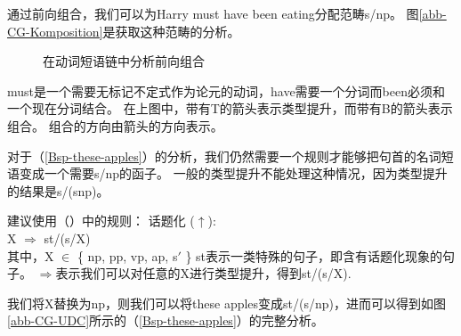 通过前向组合，我们可以为Harry must have been eating分配范畴s/np。
图\vref{abb-CG-Komposition}是获取这种范畴的分析。
\begin{figure}
\centerline{%
}
\caption{\label{abb-CG-Komposition}在动词短语链中分析前向组合}
\end{figure}%
must是一个需要无标记不定式作为论元的动词，have需要一个分词而been必须和一个现在分词结合。
在上图中，带有T的箭头表示类型提升，而带有B的箭头表示组合。
组合的方向由箭头的方向表示。

对于（\ref{Bsp-these-apples}）的分析，我们仍然需要一个规则才能够把句首的名词短语变成一个需要s/np的函子。
一般的类型提升不能处理这种情况，因为类型提升的结果是s/(s\bs np)。

 \citet[]{Steedman89a}建议使用（）中的规则：
\ea
\label{Regel-Topikalisierung}
话题化
 ($\uparrow$\isc{$\uparrow$}\is{$\uparrow$}):\\
X $\Rightarrow$ st/(s/X)\\
其中，X $\in$ \{ np, pp, vp, ap, s$'$ \}
\z
st表示一类特殊的句子，即含有话题化现象的句子。
$\Rightarrow$表示我们可以对任意的X进行类型提升，得到st/(s/X). 

我们将X替换为np，则我们可以将these apples变成st/(s/np)，进而可以得到如图\vref{abb-CG-UDC}所示的（\ref{Bsp-these-apples}）的完整分析。

